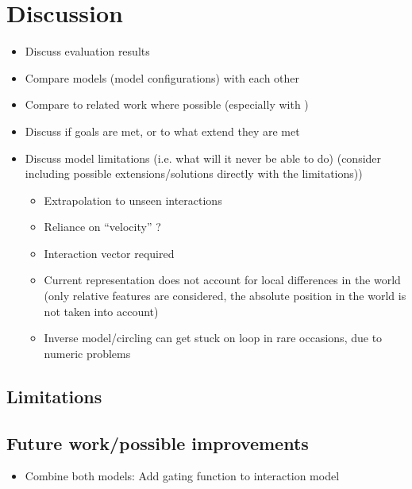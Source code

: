 \chapter{Discussion \label{chap:conclusion}}



\begin{itemize}
	\item Discuss evaluation results
	\item Compare models (model configurations) with each other
	\item Compare to related work where possible (especially with \cite{pushing})
	\item Discuss if goals are met, or to what extend they are met
	\item Discuss model limitations (i.e. what will it never be able to do) (consider including possible extensions/solutions directly with the limitations))
	\begin{itemize}
		\item Extrapolation to unseen interactions
		\item Reliance on \enquote{velocity} ?
		\item Interaction vector required
		\item Current representation does not account for local differences in the world (only relative features are considered, the absolute position in the world is not taken into account)
		\item Inverse model/circling can get stuck on loop in rare occasions, due to numeric problems
	\end{itemize}
\end{itemize}

\section{Limitations}

\section{Future work/possible improvements}

\begin{itemize}
\item Combine both models: Add gating function to interaction model
\end{itemize}